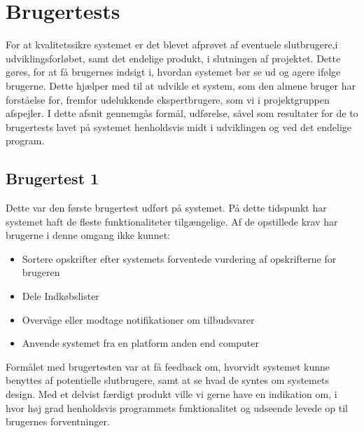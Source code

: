 \section{Brugertests}\label{s:brugertests}
For at kvalitetssikre systemet er det blevet afprøvet af eventuele slutbrugere,i udviklingsforløbet, samt det endelige produkt, i slutningen af projektet.
Dette gøres, for at få brugernes indsigt i, hvordan systemet bør se ud og agere ifølge brugerne.
Dette hjælper med til at udvikle et system, som den almene bruger har forståelse for, fremfor udelukkende ekspertbrugere, som vi i projektgruppen afspejler.
I dette afsnit gennemgås formål, udførelse, såvel som resultater for de to brugertests lavet på systemet henholdsvis midt i udviklingen og ved det endelige program.

\subsection{Brugertest 1}
Dette var den første brugertest udført på systemet.
På dette tidspunkt har systemet haft de fleste funktionaliteter tilgængelige.
Af de opstillede krav har brugerne i denne omgang ikke kunnet:
\begin{itemize}[nolistsep, noitemsep]
   \item{Sortere opskrifter efter systemets forventede vurdering af opskrifterne for brugeren}
   \item{Dele Indkøbslister}
   \item{Overvåge eller modtage notifikationer om tilbudsvarer}
   \item{Anvende systemet fra en platform anden end computer}
\end{itemize}
Formålet med brugertesten var at få feedback om, hvorvidt systemet kunne benyttes af potentielle slutbrugere, samt at se hvad de syntes om systemets design.
Med et delvist færdigt produkt ville vi gerne have en indikation om, i hvor høj grad henholdsvis programmets funktionalitet og udseende levede op til brugernes forventninger.

